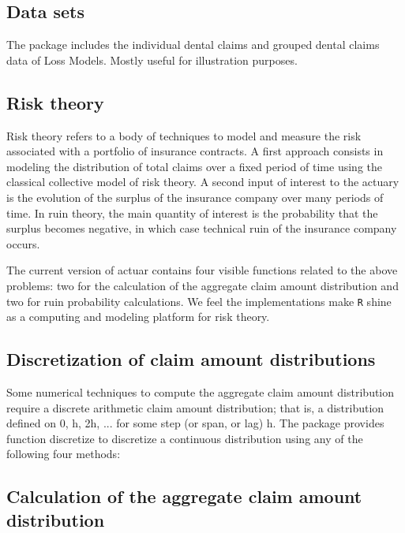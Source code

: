 \documentclass[12pt]{article}
\begin{document}
\subsection{Data sets}

The package includes the individual dental claims and grouped dental claims data of Loss Models. Mostly useful for illustration purposes. 

\subsection{Risk theory}

Risk theory refers to a body of techniques to model and measure the risk associated with a portfolio of insurance contracts. A first approach consists in modeling the distribution of total claims over a fixed period of time using the classical collective model of risk theory. A second input of interest to the actuary is the evolution of the surplus of the insurance company over many periods of time. In ruin theory, the main quantity of interest is the probability that the surplus becomes negative, in which case technical ruin of the insurance company occurs.

The current version of actuar contains four visible functions related to the above problems: two for the calculation of the aggregate claim amount distribution and two for ruin probability calculations. We feel the implementations make \texttt{R} shine as a computing and modeling platform for risk theory.

\subsection{Discretization of claim amount distributions}

Some numerical techniques to compute the aggregate claim amount distribution require a discrete arithmetic claim amount distribution; that is, a distribution defined on 0, h, 2h, ... for some step (or span, or lag) h. The package provides function discretize to discretize a continuous distribution using any of the following four methods:

\subsection{Calculation of the aggregate claim amount distribution}
\end{document}
